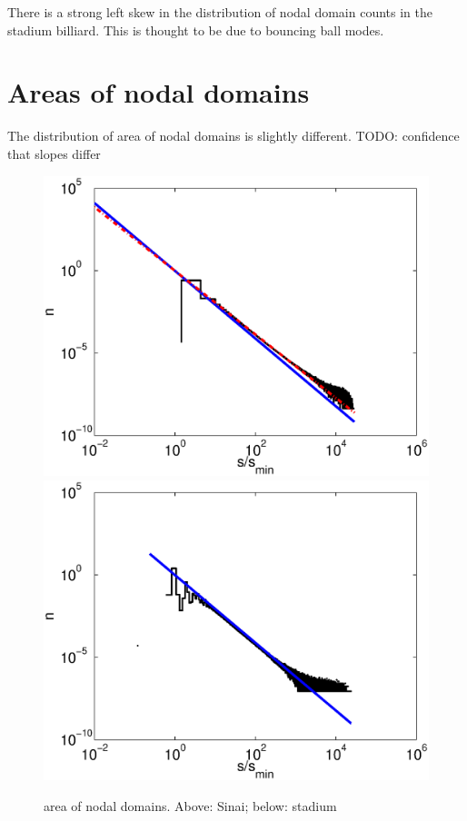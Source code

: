 \documentclass{report}
\begin{document}
There is a strong left skew in the distribution of nodal domain counts in the stadium billiard. This is thought to be due to bouncing ball modes.

\section{Areas of nodal domains}
The distribution of area of nodal domains is slightly different. TODO: confidence that slopes differ
\begin{figure}
  \begin{center}
    \includegraphics[width=\textwidth]{figs/results/qugrs_1000_to_1200_sizes.eps}
    \includegraphics[width=\textwidth]{figs/results/qust_700_to_900_sizes_0.1_sampled.eps}
    \caption{area of nodal domains. Above: Sinai; below: stadium}
    \label{fig:area}
  \end{center}
\end{figure}
\end{document}
